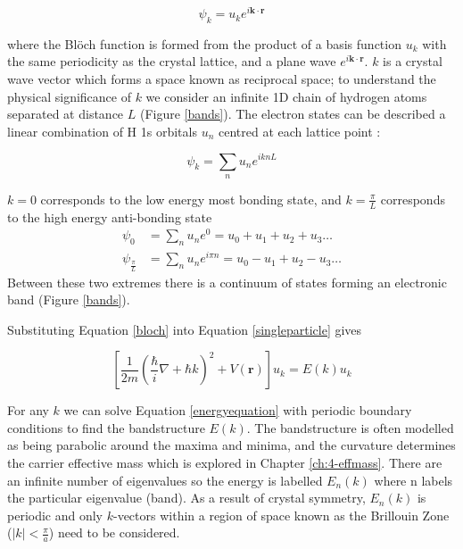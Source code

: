 \begin{equation} 
\psi_{k} = u_ke^{i\textbf{k}\cdot\textbf{r}}
\label{bloch}
\end{equation}   %

where the Bl\"{o}ch function is formed from the product of a basis function $u_k$ with the same periodicity as the crystal lattice, and a plane wave $e^{i\textbf{k}\cdot\textbf{r}}$. $k$ is a crystal wave vector which forms a space known as reciprocal space; to understand the physical significance of $k$ we consider an infinite 1D chain of hydrogen atoms separated at distance $L$ (Figure \ref{bands}). The electron states can be described a linear combination of H 1s orbitals $u_n$ centred at each lattice point :

\begin{equation} \label{1dbloch}
\psi_k = \sum_nu_ne^{iknL}
\end{equation}

$k=0$ corresponds to the low energy most bonding state, and $k=\frac{\pi}{L}$ corresponds to the high energy anti-bonding state
\begin{align}
\psi_0 &= \sum_nu_ne^0 = u_0 +u_1 +u_2 +u_3 \dots \\
\psi_{\frac{\pi}{L}} &= \sum_nu_ne^{i\pi n} = u_0 -u_1+u_2-u_3 \dots
\end{align}
Between these two extremes there is a continuum of states forming an electronic band (Figure \ref{bands}). 

Substituting Equation \ref{bloch} into Equation \ref{singleparticle} gives

\begin{equation} \label{energyequation}
\left[\frac{1}{2m}\left(\frac{\hbar}{i}\nabla+\hbar k\right)^2+V(\textbf{r})\right]u_k = E(k)u_k
\end{equation}

For any $k$ we can solve Equation \ref{energyequation} with periodic boundary conditions to find the bandstructure $E(k)$. The bandstructure is often modelled as being parabolic around the maxima and minima, and the curvature determines the carrier effective mass which is explored in Chapter \ref{ch:4-effmass}. There are an infinite number of eigenvalues so the energy is labelled $E_n(k)$ where n labels the particular eigenvalue (band). As a result of crystal symmetry, $E_n(k)$ is periodic and only $k$-vectors within a region of space known as the Brillouin Zone ($|k|<\frac{\pi}{a}$) need to be considered. %

